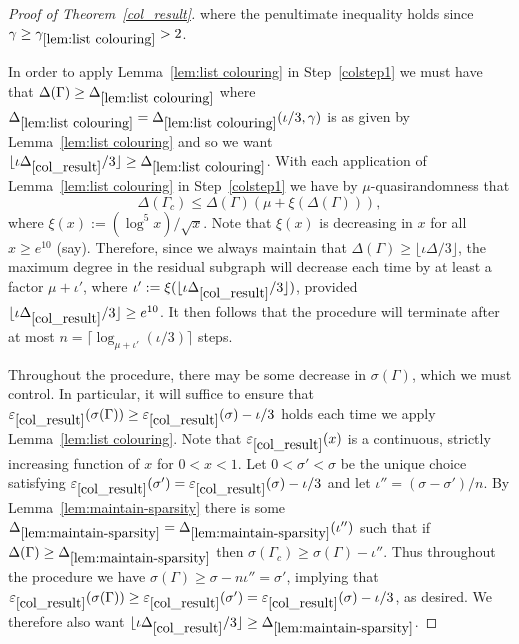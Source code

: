 \documentclass[11pt]{article}
\theoremstyle{plain}
\newcommand{\eps}{\varepsilon}
\begin{document}
\begin{proof}[Proof of Theorem~\ref{col_result}]
where the penultimate inequality holds since $\gamma \ge \gamma_{\ref{lem:list colouring}}>2$.


In order to apply Lemma~\ref{lem:list colouring} in Step~\ref{colstep1} we must have that $\Delta(\Gamma)\ge\Delta_{\ref{lem:list colouring}}$ where $\Delta_{\ref{lem:list colouring}}=\Delta_{\ref{lem:list colouring}}(\iota/3,\gamma)$ is as given by Lemma~\ref{lem:list colouring} and so we want $\lfloor\iota\Delta_{\ref{col_result}}/3\rfloor\ge \Delta_{\ref{lem:list colouring}}$. 
With each application of Lemma~\ref{lem:list colouring} in Step~\ref{colstep1} we have by $\mu$-quasirandomness that
\[
\Delta(\Gamma_c)\le \Delta(\Gamma)\left(
\mu + \xi(\Delta(\Gamma))
\right),
\] 
where $\xi(x):=(\log^5 x)/\sqrt{x}$.
Note that $\xi(x)$ is decreasing in $x$ for all $x\ge e^{10}$ (say).
Therefore, since we always maintain that $\Delta(\Gamma)\ge \lfloor \iota\Delta/3\rfloor$, the maximum degree in the residual subgraph will decrease each time by at least a factor $\mu+\iota'$, where $\iota':=\xi(\lfloor \iota\Delta_{\ref{col_result}}/3\rfloor)$, provided $\lfloor \iota\Delta_{\ref{col_result}}/3\rfloor \ge e^{10}$.
It then follows that the procedure will terminate after at most 
$n=\lceil\log_{\mu + \iota'}(\iota/3)\rceil$ steps. 

Throughout the procedure, there may be some decrease in $\sigma(\Gamma)$, which we must control.
In particular, it will suffice to ensure that $\eps_{\ref{col_result}}(\sigma(\Gamma))\ge\eps_{\ref{col_result}}(\sigma)-\iota/3$ holds each time we apply Lemma~\ref{lem:list colouring}.
Note that $\eps_{\ref{col_result}}(x)$ is a continuous, strictly increasing function of $x$ for $0<x<1$.
Let $0<\sigma'<\sigma$ be the unique choice satisfying $\eps_{\ref{col_result}}(\sigma')=\eps_{\ref{col_result}}(\sigma)-\iota/3$ 
and let $\iota''=(\sigma-\sigma')/n$.
By Lemma~\ref{lem:maintain-sparsity} there is some $\Delta_{\ref{lem:maintain-sparsity}}=\Delta_{\ref{lem:maintain-sparsity}}(\iota'')$ such that if $\Delta(\Gamma)\ge \Delta_{\ref{lem:maintain-sparsity}}$ then $\sigma(\Gamma_c)\ge \sigma(\Gamma)-\iota''$. Thus throughout the procedure we have $\sigma(\Gamma)\ge \sigma-n\iota''=\sigma'$, implying that $\eps_{\ref{col_result}}(\sigma(\Gamma))\ge\eps_{\ref{col_result}}(\sigma')=\eps_{\ref{col_result}}(\sigma)-\iota/3$, as desired.
We therefore also want $\lfloor \iota\Delta_{\ref{col_result}}/3\rfloor \ge \Delta_{\ref{lem:maintain-sparsity}}$.


\end{proof}
\end{document}
